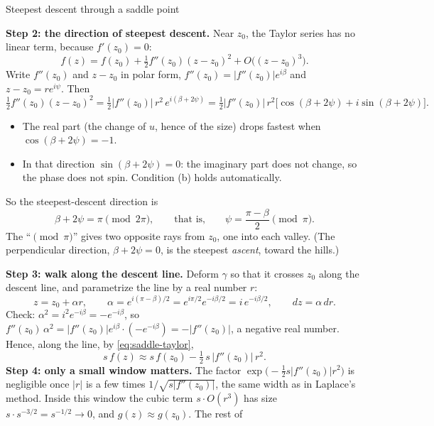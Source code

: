 \documentclass[11pt]{beamer}
\begin{document}
\begin{frame}[allowframebreaks=1.00]{Steepest descent through a saddle point}
\par\framebreak\par
\textbf{Step 2: the direction of steepest descent.} Near \(z_0\), the Taylor series has no linear term,
because \(f'(z_0)=0\):
\begin{equation}
  f(z)=f(z_0)+\tfrac12 f''(z_0)(z-z_0)^2+O\bigl((z-z_0)^3\bigr).
  \label{eq:saddle-taylor}
\end{equation}
Write \(f''(z_0)\) and \(z-z_0\) in polar form, \(f''(z_0)=|f''(z_0)|e^{i\beta}\) and \(z-z_0=re^{i\psi}\). Then
\[
  \tfrac12 f''(z_0)(z-z_0)^2
  =\tfrac12|f''(z_0)|\,r^2\,e^{i(\beta+2\psi)}
  =\tfrac12|f''(z_0)|\,r^2\bigl[\cos(\beta+2\psi)+i\sin(\beta+2\psi)\bigr].
\]
\begin{itemize}
  \item The real part (the change of \(u\), hence of the size) drops fastest when \(\cos(\beta+2\psi)=-1\).
  \item In that direction \(\sin(\beta+2\psi)=0\): the imaginary part does not change, so the phase does
        not spin. Condition (b) holds automatically.
\end{itemize}
So the steepest-descent direction is
\begin{equation}
  \beta+2\psi=\pi\pmod{2\pi},
  \qquad\text{that is,}\qquad
  \psi=\frac{\pi-\beta}{2}\pmod{\pi}.
  \label{eq:descent-direction}
\end{equation}
The ``\(\pmod\pi\)'' gives two opposite rays from \(z_0\), one into each valley. (The perpendicular
direction, \(\beta+2\psi=0\), is the steepest \emph{ascent}, toward the hills.)
\par\framebreak\par
\textbf{Step 3: walk along the descent line.} Deform \(\gamma\) so that it crosses \(z_0\) along the descent
line, and parametrize the line by a real number \(r\):
\[
  z=z_0+\alpha r,\qquad
  \alpha=e^{i(\pi-\beta)/2}=e^{i\pi/2}e^{-i\beta/2}=i\,e^{-i\beta/2},
  \qquad dz=\alpha\,dr .
\]
Check: \(\alpha^2=i^2e^{-i\beta}=-e^{-i\beta}\), so \(f''(z_0)\,\alpha^2=|f''(z_0)|e^{i\beta}\cdot(-e^{-i\beta})=-|f''(z_0)|\), a
negative real number. Hence, along the line, by \eqref{eq:saddle-taylor},
\[
  s\,f(z)\approx s\,f(z_0)-\tfrac12\,s\,|f''(z_0)|\,r^2 .
\]
\textbf{Step 4: only a small window matters.} The factor \(\exp\bigl(-\tfrac12 s|f''(z_0)|r^2\bigr)\) is negligible
once \(|r|\) is a few times \(1/\sqrt{s|f''(z_0)|}\), the same width as in Laplace's method. Inside this
window the cubic term \(s\cdot O(r^3)\) has size \(s\cdot s^{-3/2}=s^{-1/2}\to0\), and \(g(z)\approx g(z_0)\). The rest of

\end{frame}
\end{document}
